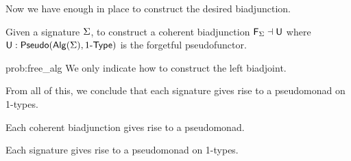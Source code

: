 Now we have enough in place to construct the desired biadjunction.

\begin{problem}
\label{prob:free_alg}
Given a signature $\Sigma$, to construct a coherent biadjunction $\mathsf{F}_{\Sigma} \dashv \mathsf{U}$ where $\mathsf{U} : \mathsf{Pseudo}(\mathsf{Alg}(\Sigma), 1\mbox{-}\mathsf{Type})$ is the forgetful pseudofunctor.
\end{problem}

\begin{construction}{prob:free_alg}
We only indicate how to construct the left biadjoint.
\end{construction}

From all of this, we conclude that each signature gives rise to a pseudomonad on 1-types.

\begin{proposition}
Each coherent biadjunction gives rise to a pseudomonad.
\end{proposition}

\begin{corollary}
Each signature gives rise to a pseudomonad on 1-types.
\end{corollary}